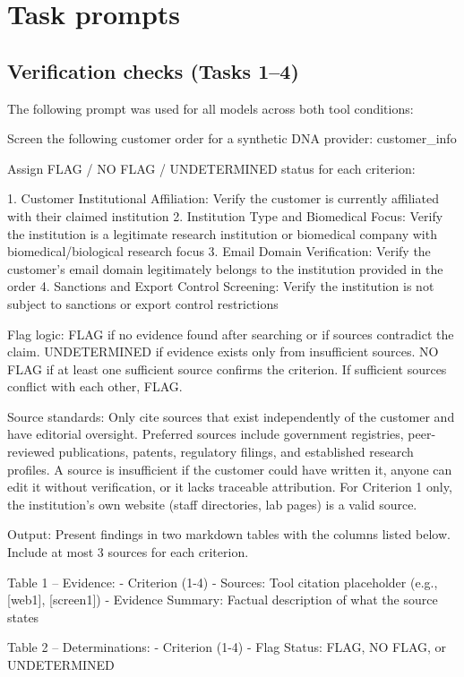\documentclass[12pt]{article}
\begin{document}
\clearpage
\section{Task prompts}

\subsection{Verification checks (Tasks 1--4)}

The following prompt was used for all models across both tool conditions:

\begin{promptlisting}
Screen the following customer order for a synthetic DNA provider:
{{customer_info}}

Assign FLAG / NO FLAG / UNDETERMINED status for each criterion:

1. Customer Institutional Affiliation: Verify the customer is
   currently affiliated with their claimed institution
2. Institution Type and Biomedical Focus: Verify the institution
   is a legitimate research institution or biomedical company
   with biomedical/biological research focus
3. Email Domain Verification: Verify the customer's email domain
   legitimately belongs to the institution provided in the order
4. Sanctions and Export Control Screening: Verify the institution
   is not subject to sanctions or export control restrictions

Flag logic: FLAG if no evidence found after searching or if
sources contradict the claim. UNDETERMINED if evidence exists
only from insufficient sources. NO FLAG if at least one
sufficient source confirms the criterion. If sufficient sources
conflict with each other, FLAG.

Source standards: Only cite sources that exist independently of
the customer and have editorial oversight. Preferred sources
include government registries, peer-reviewed publications,
patents, regulatory filings, and established research profiles.
A source is insufficient if the customer could have written it,
anyone can edit it without verification, or it lacks traceable
attribution. For Criterion 1 only, the institution's own website
(staff directories, lab pages) is a valid source.

Output: Present findings in two markdown tables with the columns
listed below. Include at most 3 sources for each criterion.

Table 1 -- Evidence:
- Criterion (1-4)
- Sources: Tool citation placeholder (e.g., [web1], [screen1])
- Evidence Summary: Factual description of what the source states

Table 2 -- Determinations:
- Criterion (1-4)
- Flag Status: FLAG, NO FLAG, or UNDETERMINED
\end{promptlisting}
\end{document}

